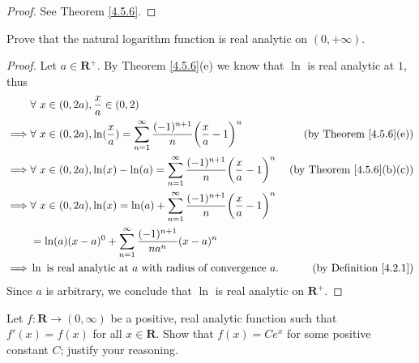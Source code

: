\begin{proof}
    See Theorem \ref{4.5.6}.
\end{proof}

\begin{exercise}\label{ex 4.5.6}
    Prove that the natural logarithm function is real analytic on \((0, +\infty)\).
\end{exercise}

\begin{proof}
    Let \(a \in \mathbf{R}^+\).
    By Theorem \ref{4.5.6}(e) we know that \(\ln\) is real analytic at \(1\), thus
    \begin{align*}
                 & \forall\ x \in (0, 2a), \frac{x}{a} \in (0, 2)                                                                                                              \\
        \implies & \forall\ x \in (0, 2a), \ln(\frac{x}{a}) = \sum_{n = 1}^\infty \frac{(-1)^{n + 1}}{n} \bigg(\frac{x}{a} - 1\bigg)^n & \text{(by Theorem \ref{4.5.6}(e))}    \\
        \implies & \forall\ x \in (0, 2a), \ln(x) - \ln(a) = \sum_{n = 1}^\infty \frac{(-1)^{n + 1}}{n} \bigg(\frac{x}{a} - 1\bigg)^n  & \text{(by Theorem \ref{4.5.6}(b)(c))} \\
        \implies & \forall\ x \in (0, 2a), \ln(x) = \ln(a) + \sum_{n = 1}^\infty \frac{(-1)^{n + 1}}{n} \bigg(\frac{x}{a} - 1\bigg)^n                                          \\
                 & = \ln(a) (x - a)^0 + \sum_{n = 1}^\infty \frac{(-1)^{n + 1}}{n a^n} (x - a)^n                                                                               \\
        \implies & \ln \text{ is real analytic at } a \text{ with radius of convergence } a.                                           & \text{(by Definition \ref{4.2.1})}
    \end{align*}
    Since \(a\) is arbitrary, we conclude that \(\ln\) is real analytic on \(\mathbf{R}^+\).
\end{proof}

\begin{exercise}\label{ex 4.5.7}
    Let \(f : \mathbf{R} \to (0, \infty)\) be a positive, real analytic function such that \(f'(x) = f(x)\) for all \(x \in \mathbf{R}\).
    Show that \(f(x) = C e^x\) for some positive constant \(C\);
    justify your reasoning.
\end{exercise}

